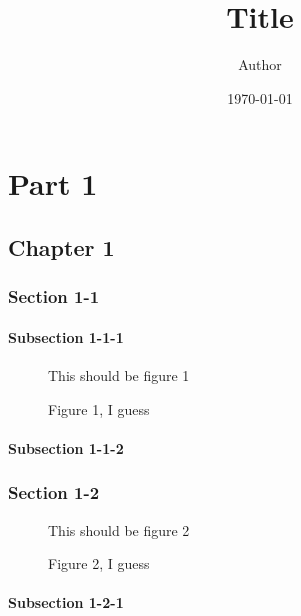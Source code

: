 \documentclass[10pt]{book}
\title{Title}
\author{Author}
\date{\today}
\begin{document}
\maketitle

\doparttoc
\dopartlot
\dopartlof

\dominitoc
\dominilot
\dominilof

\tableofcontents
\listoftables
\listoffigures


\part{Part 1}
\label{part:part-1}
\parttoc
\partlot
\partlof

\chapter{Chapter 1}
\label{cha:chapter-1}
\minitoc
\minilot
\minilof

\section{Section 1-1}
\label{sec:section-1-1}


\subsection{Subsection 1-1-1}
\label{sec:subsection-1-1-1}

\begin{figure}
  \centering
  This should be figure 1
  \caption{Figure 1, I guess}
  \label{fig:figure-1}
\end{figure}


\subsection{Subsection 1-1-2}
\label{sec:subsection-1-1-2}

\section{Section 1-2}
\label{sec:section-1-2}

\begin{figure}
  \centering
  This should be figure 2
  \caption{Figure 2, I guess}
  \label{fig:figure-2}
\end{figure}

\subsection{Subsection 1-2-1}
\label{sec:subsection-1-2-1}
\end{document}
